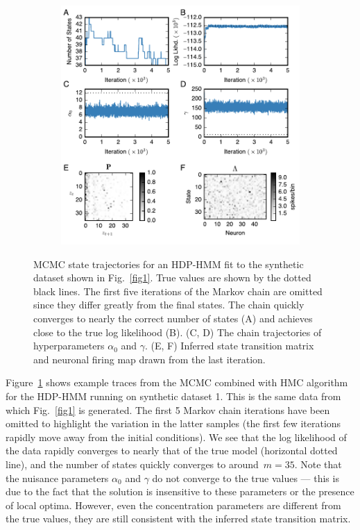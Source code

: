  
\begin{figure}
  \centering
  \begin{subfigure}[t]{5in}
    \includegraphics[width=\textwidth]{figures/ch5/Fig2}
  \end{subfigure}
  \caption[Inference results for an HDP-HMM fit to synthetic
    data]{MCMC state trajectories for an HDP-HMM fit to the synthetic
    dataset shown in Fig.~\ref{fig1}. True values are shown by the
    dotted black lines. The first five iterations of the Markov chain
    are omitted since they differ greatly from the final states. The
    chain quickly converges to nearly the correct number of states (A)
    and achieves close to the true log likelihood (B). (C, D) The
    chain trajectories of hyperparameters $\alpha_0$ and $\gamma$. (E,
    F) Inferred state transition matrix and neuronal firing map drawn
    from the last iteration.  }
  \label{fig2}
\end{figure}

Figure~\ref{fig2} shows example traces from the MCMC combined with HMC
algorithm for the HDP-HMM running on synthetic dataset 1. This is the
same data from which Fig.~\ref{fig1} is generated. The first 5 Markov
chain iterations have been omitted to highlight the variation in the
latter samples (the first few iterations rapidly move away from the
initial conditions). We see that the log likelihood of the data
rapidly converges to nearly that of the true model (horizontal dotted
line), and the number of states quickly converges to around~$m=35$.
Note that the nuisance parameters $\alpha_0$ and $\gamma$ do not
converge to the true values --- this is due to the fact that the
solution is insensitive to these parameters or the presence of local
optima.  However, even the concentration parameters are different from
the true values, they are still consistent with the inferred state
transition matrix.

